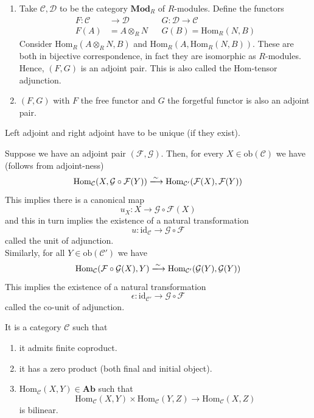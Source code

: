 \documentclass[oneside, 12pt]{scrbook}
\newcommand{\Hom}{\mathrm{Hom}}
\theoremstyle{theorem}
\begin{document}
\begin{example}
\begin{enumerate}
\item Take $\mathcal{C,D}$ to be the category $\mathbf{Mod}_{R}$ of $R$-modules. Define the functors 
\begin{align*}
F: \mathcal{C} &\rightarrow \mathcal{D} & & G: \mathcal{D} \rightarrow \mathcal{C} \\
F(A) &= A \otimes_{R} N & & G(B) = \Hom_{R}(N,B)
\end{align*}
Consider $\Hom_{R}(A \otimes_{R} N , B)$ and $\Hom_{R}(A, \Hom_{R}(N,B))$. These are both in bijective correspondence, in fact they are isomorphic as $R$-modules. Hence, $(F,G)$ is an adjoint pair. This is also called the Hom-tensor adjunction.
\item $(F,G)$ with $F$ the free functor and $G$ the forgetful functor is also an adjoint pair. 
\end{enumerate}
\end{example}

\begin{proposition}
Left adjoint and right adjoint have to be unique (if they exist).
\end{proposition}

Suppose we have an adjoint pair $(\mathcal{F}, \mathcal{G})$. Then, for every $X \in \mathrm{ob}(\mathcal{C})$ we have (follows from adjoint-ness) $$\mathrm{Hom}_{\mathcal{C}}(X, \mathcal{G}\circ \mathcal{F}(Y)) \xlongrightarrow{\sim} \mathrm{Hom}_{\mathcal{C}'}(\mathcal{F}(X),\mathcal{F}(Y))$$
This implies there is a canonical map $$u_{X}: X \rightarrow \mathcal{G} \circ \mathcal{F}(X)$$ and this in turn implies the existence of a natural transformation $$u: \mathrm{id}_{\mathcal{C}} \rightarrow \mathcal{G} \circ \mathcal{F}$$ called the unit of adjunction. \\
Similarly, for all $Y \in \mathrm{ob}(\mathcal{C}')$ we have 
$$\mathrm{Hom}_{\mathcal{C}}(\mathcal{F}\circ \mathcal{G}(X), Y) \xlongrightarrow{\sim} \mathrm{Hom}_{\mathcal{C}'}(\mathcal{G}(Y),\mathcal{G}(Y))$$
This implies the existence of a natural transformation $$\epsilon : \mathrm{id}_{\mathcal{C}'} \rightarrow \mathcal{G} \circ \mathcal{F}$$ called the co-unit of adjunction.


\begin{definition}
It is a category $\mathcal{C}$ such that 
\begin{enumerate}
\item it admits finite coproduct.
\item it has a zero product (both final and initial object).
\item $\mathrm{Hom}_{\mathcal{C}}(X,Y) \in \mathbf{Ab}$ such that $$\mathrm{Hom}_{\mathcal{C}}(X,Y) \times \mathrm{Hom}_{\mathcal{C}}(Y,Z) \rightarrow \mathrm{Hom}_{\mathcal{C}}(X,Z)$$ is bilinear.
\end{enumerate}
\end{definition}
\end{document}
